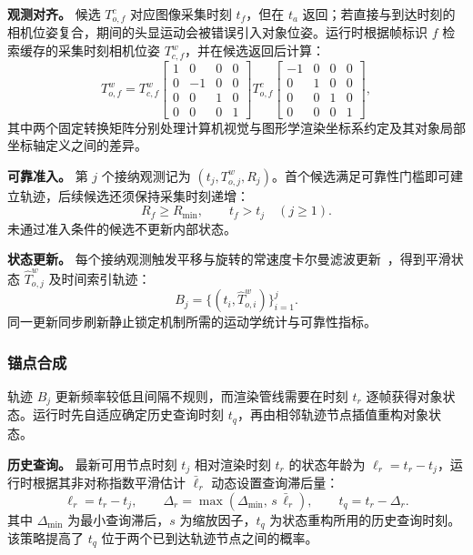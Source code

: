 \documentclass[review]{vgtc}
\begin{document}
\textbf{观测对齐。}
候选 $T_{o,f}^{c}$ 对应图像采集时刻 $t_f$，但在 $t_a$ 返回；若直接与到达时刻的相机位姿复合，期间的头显运动会被错误引入对象位姿。运行时根据帧标识 $f$ 检索缓存的采集时刻相机位姿 $T_{c,f}^{w}$，并在候选返回后计算：
\begin{equation}
T_{o,f}^{w} = T_{c,f}^{w}
\begin{bmatrix}
1 & 0 & 0 & 0 \\
0 & -1 & 0 & 0 \\
0 & 0 & 1 & 0 \\
0 & 0 & 0 & 1
\end{bmatrix}
T_{o,f}^{c}
\begin{bmatrix}
-1 & 0 & 0 & 0 \\
0 & 1 & 0 & 0 \\
0 & 0 & 1 & 0 \\
0 & 0 & 0 & 1
\end{bmatrix},
\label{eq:capture-alignment}
\end{equation}
其中两个固定转换矩阵分别处理计算机视觉与图形学渲染坐标系约定及其对象局部坐标轴定义之间的差异。

\textbf{可靠准入。}
第 $j$ 个接纳观测记为 $(t_j,T_{o,j}^{w},R_j)$。首个候选满足可靠性门槛即可建立轨迹，后续候选还须保持采集时刻递增：
\begin{equation}
R_f \geq R_{\min}, \qquad t_f > t_j \quad (j \geq 1).
\label{eq:admission}
\end{equation}
未通过准入条件的候选不更新内部状态。

\textbf{状态更新。}
每个接纳观测触发平移与旋转的常速度卡尔曼滤波更新~\cite{kalman1960new}，得到平滑状态 $\widehat{T}_{o,j}^{w}$ 及时间索引轨迹：
\begin{equation}
B_j = \{(t_i, \widehat{T}_{o,i}^{w})\}_{i=1}^{j}.
\label{eq:trajectory}
\end{equation}
同一更新同步刷新静止锁定机制所需的运动学统计与可靠性指标。

\subsubsection{锚点合成}\label{sec:frame-output}

轨迹 $B_j$ 更新频率较低且间隔不规则，而渲染管线需要在时刻 $t_r$ 逐帧获得对象状态。运行时先自适应确定历史查询时刻 $t_q$，再由相邻轨迹节点插值重构对象状态。

\textbf{历史查询。}
最新可用节点时刻 $t_j$ 相对渲染时刻 $t_r$ 的状态年龄为 $\ell_r=t_r-t_j$，运行时根据其非对称指数平滑估计 $\bar{\ell}_r$ 动态设置查询滞后量：
\begin{equation}
\ell_r = t_r - t_j, \qquad \Delta_r = \max(\Delta_{\min},\, s\,\bar{\ell}_r), \qquad t_q = t_r - \Delta_r.
\label{eq:target-time}
\end{equation}
其中 $\Delta_{\min}$ 为最小查询滞后，$s$ 为缩放因子，$t_q$ 为状态重构所用的历史查询时刻。该策略提高了 $t_q$ 位于两个已到达轨迹节点之间的概率。
\end{document}
